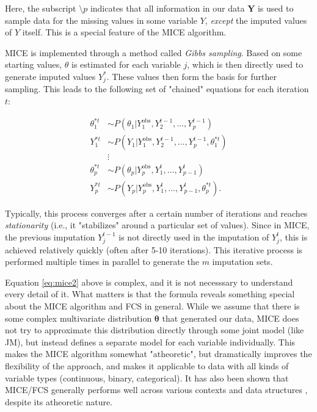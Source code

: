 Here, the subscript $\setminus p$ indicates that all information in our data $\mathbf{Y}$ is used to sample data for the missing values in some variable $Y$, \emph{except} the imputed values of $Y$ itself. This is a special feature of the \textsf{MICE} algorithm.

\textsf{MICE} is implemented through a method called \emph{Gibbs sampling}. Based on some starting values, $\theta$ is estimated for each variable $j$, which is then directly used to generate imputed values $Y^{*}_{j}$. These values then form the basis for further sampling. This leads to the following set of "chained" equations for each iteration $t$:

\begin{equation}
\begin{split} \label{eq:mice2}
\theta^{*t}_1 &\sim P(\theta_1|Y^{\text{obs}}_1, Y_2^{t-1}, \dots, Y_p^{t-1}) \\
Y^{*t}_1 &\sim P(Y_1|Y^{\text{obs}}_1, Y_2^{t-1}, \dots, Y_p^{t-1}, \theta_1^{*t}) \\
&\vdots \\
\theta^{*t}_p &\sim P(\theta_p|Y^{\text{obs}}_p, Y_1^{t}, \dots, Y_{p-1}^{t}) \\
Y^{*t}_p &\sim P(Y_p|Y^{\text{obs}}_p, Y_1^{t}, \dots, Y_{p-1}^{t}, \theta_{p}^{*t}).
\end{split}
\end{equation}

Typically, this process converges after a certain number of iterations and reaches \emph{stationarity} (i.e., it "stabilizes" around a particular set of values). Since in \textsf{MICE}, the previous imputation $Y^{t-1}_j$ is not directly used in the imputation of $Y^{t}_j$, this is achieved relatively quickly (often after 5-10 iterations). This iterative process is performed multiple times in parallel to generate the $m$ imputation sets.

Equation \ref{eq:mice2} above is complex, and it is not necesssary to understand every detail of it. What matters is that the formula reveals something special about the \textsf{MICE} algorithm and FCS in general. While we assume that there is some complex multivariate distribution $\boldsymbol{\theta}$ that generated our data, \textsf{MICE} does not try to approximate this distribution directly through some joint model (like JM), but instead defines a separate model for each variable individually. This makes the \textsf{MICE} algorithm somewhat "atheoretic", but dramatically improves the flexibility of the approach, and makes it applicable to data with all kinds of variable types (continuous, binary, categorical). It has also been shown that \textsf{MICE}/FCS generally performs well across various contexts and data structures \citep{grund2018multiple, van2006fully, van2007multiple, enders2018comparison, de2017comparison}, despite its atheoretic nature. 

